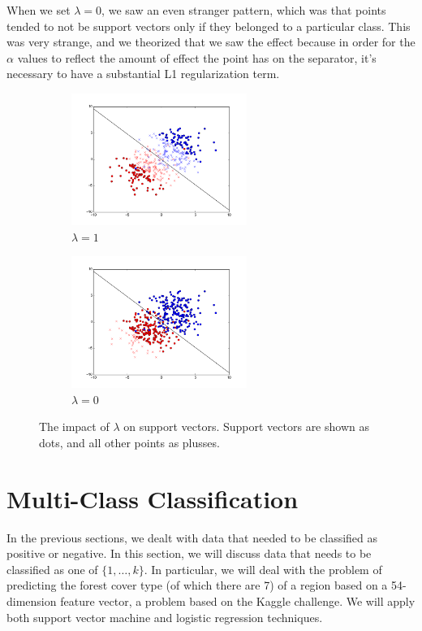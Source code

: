 \documentclass{sigchi}
\begin{document}
When we set $\lambda = 0$, we saw an even stranger pattern, which was that points tended to not be support vectors only if they belonged to a particular class. This was very strange, and we theorized that we saw the effect because in order for the $\alpha$ values to reflect the amount of effect the point has on the separator, it's necessary to have a substantial L1 regularization term.

\begin{figure}
\centering

\begin{subfigure}[b]{2.25in}
	\includegraphics[width = 2.25in]{plots/stdev2_test_plot_lambda_sup_vectors.png}
	\caption{$\lambda = 1$}
\end{subfigure}

\begin{subfigure}[b]{2.25in}
	\includegraphics[width = 2.25in]{plots/stdev2_test_plot_lambda_0_supvec.png}
	\caption{$\lambda = 0$}
\end{subfigure}
\caption{The impact of $\lambda$ on support vectors. Support vectors are shown as dots, and all other points as plusses.}
\end{figure}





\section{Multi-Class Classification}

In the previous sections, we dealt with data that needed to be classified as positive or negative. In this section, we will discuss data that needs to be classified as one of $\{1, \hdots, k\}$. In particular, we will deal with the problem of predicting the forest cover type (of which there are 7) of a region based on a 54-dimension feature vector, a problem based on the Kaggle challenge. We will apply both support vector machine and logistic regression techniques.
\end{document}
